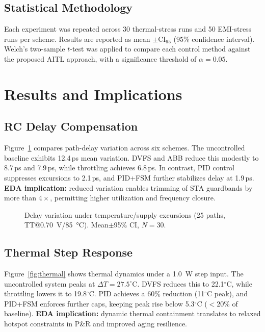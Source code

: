 \documentclass[conference]{IEEEtran}
\newcommand{\CI}{\mathrm{CI}_{95}}
\begin{document}
\subsection{Statistical Methodology}
Each experiment was repeated across 30 thermal-stress runs and 50 EMI-stress runs per scheme. Results are reported as mean $\pm \CI$ (95\% confidence interval). Welch’s two-sample $t$-test was applied to compare each control method against the proposed AITL approach, with a significance threshold of $\alpha=0.05$.

\section{Results and Implications}

\subsection{RC Delay Compensation}
Figure~\ref{fig:rc} compares path-delay variation across six schemes.  
The uncontrolled baseline exhibits 12.4\,ps mean variation. DVFS and ABB reduce this modestly to 8.7\,ps and 7.9\,ps, while throttling achieves 6.8\,ps. In contrast, PID control suppresses excursions to 2.1\,ps, and PID+FSM further stabilizes delay at 1.9\,ps.  
\textbf{EDA implication:} reduced variation enables trimming of STA guardbands by more than $4\times$, permitting higher utilization and frequency closure.

\begin{figure}[t]
\centering
{}
\caption{Delay variation under temperature/supply excursions (25 paths, TT@\SI{0.70}{V}/\SI{85}{\celsius}). Mean$\pm$95\% CI, $N=30$.}
\label{fig:rc}
\end{figure}

\subsection{Thermal Step Response}
Figure~\ref{fig:thermal} shows thermal dynamics under a \SI{1.0}{W} step input.  
The uncontrolled system peaks at $\Delta T=27.5^{\circ}$C. DVFS reduces this to 22.1$^{\circ}$C, while throttling lowers it to 19.8$^{\circ}$C. PID achieves a 60\% reduction (11$^{\circ}$C peak), and PID+FSM enforces further caps, keeping peak rise below 5.3$^{\circ}$C ($<20\%$ of baseline).  
\textbf{EDA implication:} dynamic thermal containment translates to relaxed hotspot constraints in P\&R and improved aging resilience.
\end{document}
